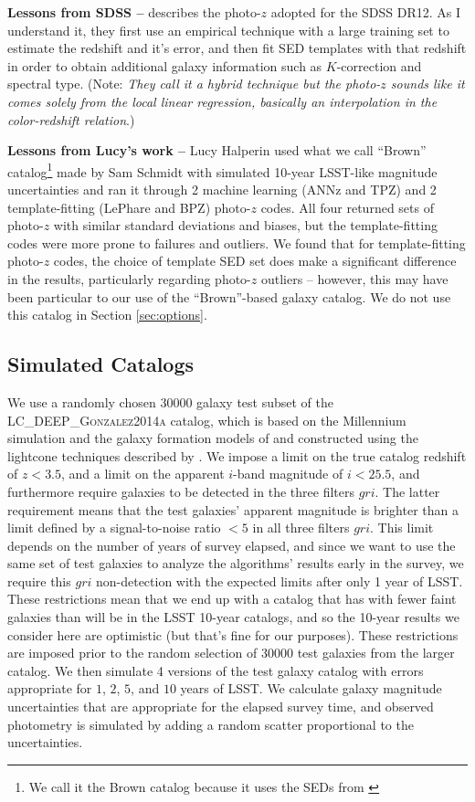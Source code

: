 \documentclass[DM,lsstdraft,toc]{lsstdoc}
\begin{document}
\textbf{Lessons from SDSS --} \cite{2016MNRAS.460.1371B} describes the photo-$z$ adopted for the SDSS DR12. As I understand it, they first use an empirical technique with a large training set to estimate the redshift and it's error, and then fit SED templates with that redshift in order to obtain additional galaxy information such as $K$-correction and spectral type. (Note: \textit{They call it a hybrid technique but the photo-$z$ sounds like it comes solely from the local linear regression, basically an interpolation in the color-redshift relation}.)

\textbf{Lessons from Lucy's work --} Lucy Halperin used what we call ``Brown'' catalog\footnote{We call it the Brown catalog because it uses the SEDs from \cite{2014ApJS..212...18B}} made by Sam Schmidt with simulated 10-year LSST-like magnitude uncertainties and ran it through 2 machine learning (ANNz and TPZ) and 2 template-fitting (LePhare and BPZ) photo-$z$ codes. All four returned sets of photo-$z$ with similar standard deviations and biases, but the template-fitting codes were more prone to failures and outliers. We found that for template-fitting photo-$z$ codes, the choice of template SED set does make a significant difference in the results, particularly regarding photo-$z$ outliers -- however, this may have been particular to our use of the ``Brown''-based galaxy catalog. We do not use this catalog in Section \ref{sec:options}.

\subsection{Simulated Catalogs}\label{ssec:cats}

We use a randomly chosen 30000 galaxy test subset of the \textsc{LC\_DEEP\_Gonzalez2014a} catalog, which is based on the Millennium simulation \citep{2005Natur.435..629S} and the galaxy formation models of \cite{2014MNRAS.439..264G} and constructed using the lightcone techniques described by \cite{2013MNRAS.429..556M}. We impose a limit on the true catalog redshift of $z<3.5$, and a limit on the apparent $i$-band magnitude of $i<25.5$, and furthermore require galaxies to be detected in the three filters $gri$. The latter requirement means that the test galaxies' apparent magnitude is brighter than a limit defined by a signal-to-noise ratio $<5$ in all three filters $gri$. This limit depends on the number of years of survey elapsed, and since we want to use the same set of test galaxies to analyze the algorithms' results early in the survey, we require this $gri$ non-detection with the expected limits after only 1 year of LSST. These restrictions mean that we end up with a catalog that has with fewer faint galaxies than will be in the LSST 10-year catalogs, and so the 10-year results we consider here are optimistic (but that's fine for our purposes). These restrictions are imposed prior to the random selection of 30000 test galaxies from the larger catalog. We then simulate 4 versions of the test galaxy catalog with errors appropriate for $1$, $2$, $5$, and $10$ years of LSST. We calculate galaxy magnitude uncertainties that are appropriate for the elapsed survey time, and observed photometry is simulated by adding a random scatter proportional to the uncertainties.
\end{document}
